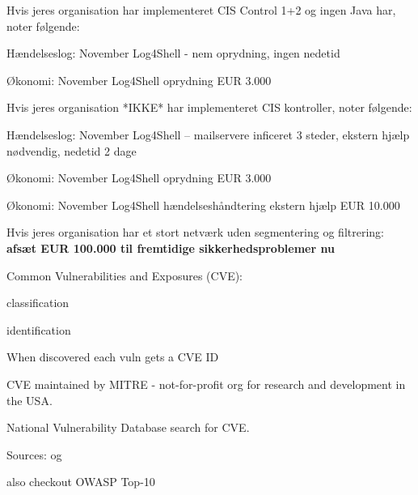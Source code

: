 \documentclass[Screen16to9,17pt]{foils}
\begin{document}

Hvis jeres organisation har implementeret CIS Control 1+2 og ingen Java har, noter følgende:
\begin{list2}
\item Hændelseslog: November Log4Shell - nem oprydning, ingen nedetid
\item Økonomi: November Log4Shell oprydning EUR 3.000
\end{list2}


Hvis jeres organisation *IKKE* har implementeret CIS kontroller, noter følgende:
\begin{list2}
\item Hændelseslog: November Log4Shell -- mailservere inficeret 3 steder, ekstern hjælp nødvendig, nedetid 2 dage
\item Økonomi: November Log4Shell oprydning EUR 3.000
\item Økonomi: November Log4Shell hændelseshåndtering ekstern hjælp EUR 10.000
\end{list2}

Hvis jeres organisation har et stort netværk uden segmentering og filtrering:\\
{\bf afsæt EUR 100.000 til fremtidige sikkerhedsproblemer nu}





\begin{list1}
\item Common Vulnerabilities and Exposures (CVE):
  \begin{list2}
  \item classification
  \item identification
  \end{list2}
\item When discovered each vuln gets a CVE ID
\item CVE maintained by MITRE - not-for-profit
org for research and development in the USA.
\item National Vulnerability Database search for CVE.
\item Sources:  og 
\item also checkout OWASP Top-10 
\end{list1}


\end{document}
